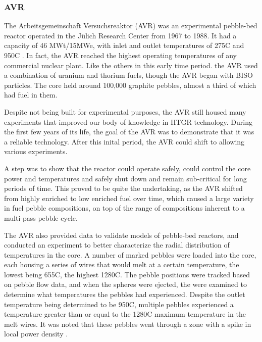 \subsubsection{AVR}

The Arbeitsgemeinschaft Versuchsreaktor (AVR) was an experimental pebble-bed reactor operated in the Jülich Research Center from 1967 to 1988.  It had a capacity of 46 MWt/15MWe, with inlet and outlet temperatures of 275\textdegree  C and 950\textdegree  C \cite{beck_high_nodate}.  In fact, the AVR reached the highest operating temperatures of any commercial nuclear plant.  Like the others in this early time period. the AVR used a combination of uranium and thorium fuels, though the AVR began with BISO particles.  The core held around 100,000 graphite pebbles, almost a third of which had fuel in them.

Despite not being built for experimental purposes, the AVR still housed many experiments that improved our body of knowledge in HTGR technology.  During the first few years of its life, the goal of the AVR was to demonstrate that it was a reliable technology.  After this inital period, the AVR could shift to allowing various experiments.

A step was to show that the reactor could operate safely, could control the core power and temperatures and safely shut down and remain sub-critical for long periods of time.  This proved to be quite the undertaking, as the AVR shifted from highly enriched to low enriched fuel over time, which caused a large variety in fuel pebble compositions, on top of the range of compositions inherent to a multi-pass pebble cycle.

The AVR also provided data to validate models of pebble-bed reactors, and conducted an experiment to better characterize the radial distribution of temperatures in the core.  A number of marked pebbles were loaded into the core, each housing a series of wires that would melt at a certain temperature, the lowest being 655\textdegree  C, the highest 1280\textdegree  C.  The pebble positions were tracked based on pebble flow data, and when the spheres were ejected, the were examined to determine what temperatures the pebbles had experienced.  Despite the outlet temperature being determined to be 950\textdegree  C, multiple pebbles experienced a temperature greater than or equal to the 1280\textdegree C maximum temperature in the melt wires.  It was noted that these pebbles went through a zone with a spike in local power density \cite{noauthor_results_1990}.

